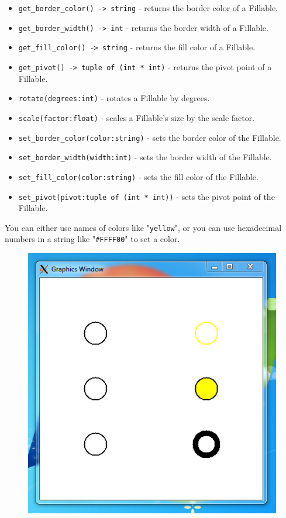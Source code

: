 \documentclass{article}
\begin{document}
\begin{itemize}
\item \verb|get_border_color() -> string| - returns the border color of a Fillable.
\item \verb|get_border_width() -> int| - returns the border width of a Fillable.
\item \verb|get_fill_color() -> string| - returns the fill color of a Fillable.
\item \verb|get_pivot() -> tuple of (int * int)| - returns the pivot point of a Fillable.
\item \verb|rotate(degrees:int)| - rotates a Fillable by degrees.
\item \verb|scale(factor:float)| - scales a Fillable's size by the scale factor. 
\item \verb|set_border_color(color:string)| - sets the border color of the Fillable.
\item \verb|set_border_width(width:int)| - sets the border width of the Fillable.
\item \verb|set_fill_color(color:string)| - sets the fill color of the Fillable.
\item \verb|set_pivot(pivot:tuple of (int * int))| - sets the pivot point of the Fillable.
\end{itemize}
You can either use names of colors like "\verb|yellow|", or you can use hexadecimal numbers in a string like "\verb|#FFFF00|" to set a color.

\begin{figure}[h]
\centering
\includegraphics[width=.5\textwidth]{fillableAttributes}

\end{figure}
\end{document}

